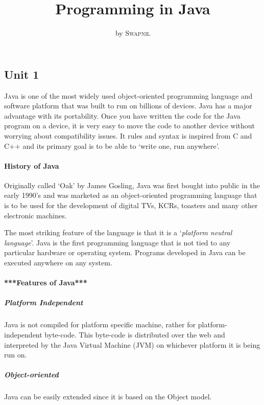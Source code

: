 \documentclass[twocolumn, a4paper]{article}
\title{Programming in Java}
\author{
  by \textsc{Swapnil}
}
\date{}
\begin{document}
\maketitle

\begin{tcolorbox}%
  \part{Unit 1}
\end{tcolorbox}

\lettrine[nindent=0.2em,lines=2]{J}ava is one of the most widely used
object-oriented programming language and software platform that was built to
run on billions of devices. Java has a major advantage with its portability.
Once you have written the code for the Java program on a device, it is very
easy to move the code to another device without worrying about compatibility
issues. It rules and syntax is inspired from C and C++ and its primary goal is
to be able to `write one, run anywhere'.

\subsection{History of Java}
Originally called `Oak' by James Gosling, Java was first bought into public in
the early 1990's and was marketed as an object-oriented programming language
that is to be used for the development of digital TVs, KCRs, toasters and many
other electronic machines.

The most striking feature of the language is that it is a `\emph{platform
neutral language}'. Java is the first programming language that is not tied to
any particular hardware or operating system. Programs developed in Java can be
executed anywhere on any system.

\subsection{***Features of Java***}
\subsubsection{Platform Independent}%
Java is not compiled for platform specific machine, rather for
platform-independent byte-code. This byte-code is distributed over the web and
interpreted by the Java Virtual Machine (JVM) on whichever platform it is
being run on.%

\subsubsection{Object-oriented}%
Java can be easily extended since it is based on the Object model.%
\end{document}

